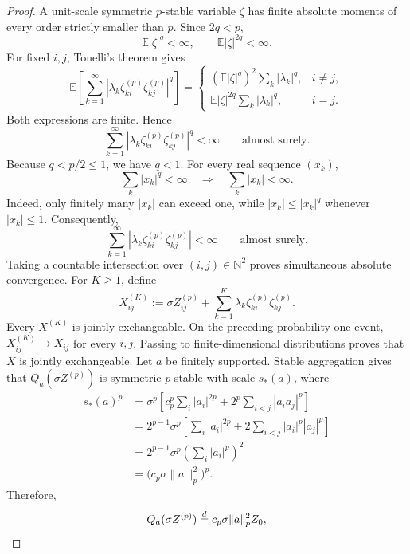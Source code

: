 \begin{proof}
A unit-scale symmetric \(p\)-stable variable \(\zeta\) has finite
absolute moments of every order strictly smaller than \(p\). Since
\(2q<p\),
\[
\mathbb E|\zeta|^q<\infty,
\qquad
\mathbb E|\zeta|^{2q}<\infty.
\]
For fixed \(i,j\), Tonelli's theorem gives
\[
\mathbb E\!\left[
 \sum_{k=1}^{\infty}
 \left|
  \lambda_k
  \zeta^{(p)}_{ki}\zeta^{(p)}_{kj}
 \right|^q
\right]
=
\begin{cases}
(\mathbb E|\zeta|^q)^2
 \displaystyle\sum_k|\lambda_k|^q,
 & i\neq j,\\[3mm]
\mathbb E|\zeta|^{2q}
 \displaystyle\sum_k|\lambda_k|^q,
 & i=j.
\end{cases}
\]
Both expressions are finite. Hence
\[
\sum_{k=1}^{\infty}
\left|
 \lambda_k
 \zeta^{(p)}_{ki}\zeta^{(p)}_{kj}
\right|^q
<\infty
\qquad\text{almost surely}.
\]
Because \(q<p/2\leq1\), we have \(q<1\). For every real sequence
\((x_k)\),
\[
\sum_k|x_k|^q<\infty
\quad\Longrightarrow\quad
\sum_k|x_k|<\infty.
\]
Indeed, only finitely many \(|x_k|\) can exceed one, while
\(|x_k|\leq|x_k|^q\) whenever \(|x_k|\leq1\). Consequently,
\[
\sum_{k=1}^{\infty}
\left|
 \lambda_k
 \zeta^{(p)}_{ki}\zeta^{(p)}_{kj}
\right|
<\infty
\qquad\text{almost surely}.
\]
Taking a countable intersection over \((i,j)\in\mathbb N^2\) proves
simultaneous absolute convergence.
For \(K\geq1\), define
\[
X^{(K)}_{ij}
:=
\sigma Z^{(p)}_{ij}
+
\sum_{k=1}^{K}
\lambda_k\zeta^{(p)}_{ki}\zeta^{(p)}_{kj}.
\]
Every \(X^{(K)}\) is jointly exchangeable. On the preceding
probability-one event, \(X^{(K)}_{ij}\to X_{ij}\) for every \(i,j\).
Passing to finite-dimensional distributions proves that \(X\) is
jointly exchangeable.
Let \(a\) be finitely supported. Stable aggregation gives that
\(Q_a(\sigma Z^{(p)})\) is symmetric \(p\)-stable with scale \(s_*(a)\),
where
\begin{align*}
s_*(a)^p
&=
\sigma^p
\left[
 c_p^p\sum_i|a_i|^{2p}
 +
 2^p\sum_{i<j}|a_ia_j|^p
\right]                                                     \\
&=
2^{p-1}\sigma^p
\left[
 \sum_i|a_i|^{2p}
 +
 2\sum_{i<j}|a_i|^p|a_j|^p
\right]                                                     \\
&=
2^{p-1}\sigma^p
\left(\sum_i|a_i|^p\right)^2                               \\
&=
\bigl(c_p\sigma\|a\|_p^2\bigr)^p.
\end{align*}
Therefore,
\begin{equation}
\label{eq:noise-qf-proof}
Q_a(\sigma Z^{(p)})
\eqd
c_p\sigma\|a\|_p^2Z_0,

\end{equation}
\end{proof}
